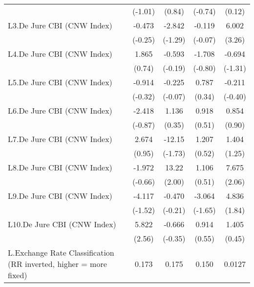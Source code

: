 {\begin{longtable}{l*{4}{c}}
                &  (-1.01)         &   (0.84)         &  (-0.74)         &   (0.12)         \\
[1em]
L3.De Jure CBI (CNW Index)&   -0.473         &   -2.842         &   -0.119         &    6.002\sym{**} \\
                &  (-0.25)         &  (-1.29)         &  (-0.07)         &   (3.26)         \\
[1em]
L4.De Jure CBI (CNW Index)&    1.865         &   -0.593         &   -1.708         &   -0.694         \\
                &   (0.74)         &  (-0.19)         &  (-0.80)         &  (-1.31)         \\
[1em]
L5.De Jure CBI (CNW Index)&   -0.914         &   -0.225         &    0.787         &   -0.211         \\
                &  (-0.32)         &  (-0.07)         &   (0.34)         &  (-0.40)         \\
[1em]
L6.De Jure CBI (CNW Index)&   -2.418         &    1.136         &    0.918         &    0.854         \\
                &  (-0.87)         &   (0.35)         &   (0.51)         &   (0.90)         \\
[1em]
L7.De Jure CBI (CNW Index)&    2.674         &   -12.15         &    1.207         &    1.404         \\
                &   (0.95)         &  (-1.73)         &   (0.52)         &   (1.25)         \\
[1em]
L8.De Jure CBI (CNW Index)&   -1.972         &    13.22\sym{*}  &    1.106         &    7.675\sym{*}  \\
                &  (-0.66)         &   (2.00)         &   (0.51)         &   (2.06)         \\
[1em]
L9.De Jure CBI (CNW Index)&   -4.117         &   -0.470         &   -3.064         &    4.836         \\
                &  (-1.52)         &  (-0.21)         &  (-1.65)         &   (1.84)         \\
[1em]
L10.De Jure CBI (CNW Index)&    5.822\sym{*}  &   -0.666         &    0.914         &    1.405         \\
                &   (2.56)         &  (-0.35)         &   (0.55)         &   (0.45)         \\
[1em]
L.Exchange Rate Classification (RR inverted, higher = more fixed)&    0.173         &    0.175         &    0.150         &   0.0127         \\

\end{longtable}}
